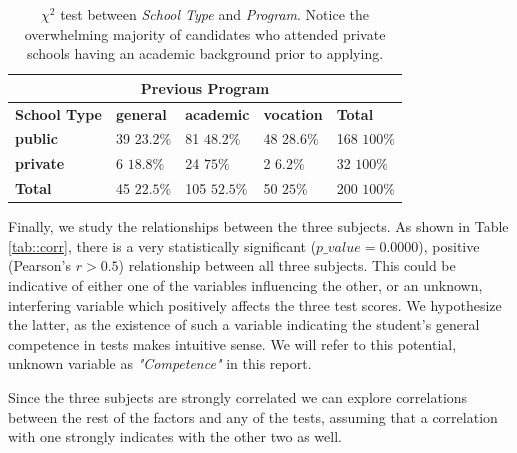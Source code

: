 \documentclass[10pt, a4paper]{article}
\begin{document}
	\begin{table}
		\centering
		\begin{tabular}
			{ |p{2cm} | p{1.2cm} p{1.2cm} p{1.2cm} | p{1.2cm} | }
			\hline
			\multicolumn{5}{|c|}{\textbf{Previous Program}}\\
			\hline
			\textbf{School Type} & \textbf{general} & \textbf{academic} & \textbf{vocation} & \textbf{Total}\\
			\hline
			\textbf{public} & \makecell{39 \\ $23.2\%$} & \makecell{81 \\ $48.2\%$} & \makecell{48 \\ $28.6\%$} & \makecell{168 \\ $100\%$} \\
			\textbf{private} & \makecell{6 \\ $18.8\%$} & \makecell{24 \\ $75\%$} & \makecell{2 \\ $6.2\%$} & \makecell{32 \\ $100\%$}\\
			\hline
			\textbf{Total} & \makecell{45 \\ $22.5\%$} & \makecell{105 \\ $52.5\%$} & \makecell{50 \\ $25\%$} & \makecell{200 \\ $100\%$}\\
			\hline
		\end{tabular}
		\caption{$\chi^2$ test between \textit{School Type} and \textit{Program}. Notice the overwhelming majority of candidates who attended private schools having an academic background prior to applying.}
		\label{tab::chisq}
	\end{table}
	
	
	Finally, we study the relationships between the three subjects. As shown in Table \ref{tab::corr}, there is a very statistically significant ($p\_value = 0.0000$), positive (Pearson's $r > 0.5$) relationship between all three subjects. This could be indicative of either one of the variables influencing the other, or an unknown, interfering variable which positively affects the three test scores. We hypothesize the latter, as the existence of such a variable indicating the student's general competence in tests makes intuitive sense. We will refer to this potential, unknown variable as \textit{"Competence"} in this report.
	
	Since the three subjects are strongly correlated we can explore correlations between the rest of the factors and any of the tests, assuming that a correlation with one strongly indicates with the other two as well. 
	
\end{document}
